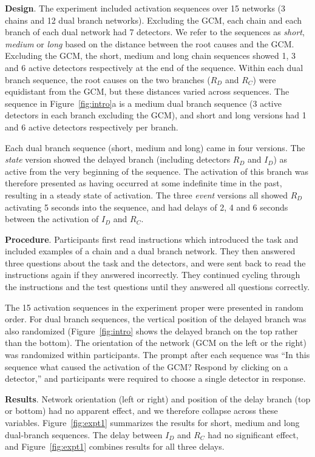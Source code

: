 \documentclass[10pt,letterpaper]{article}
\newcommand{\ev}[2]{$#1_#2$}
\begin{document}
\textbf{Design}.  The experiment included activation sequences over 15 networks (3 chains and 12 dual branch networks). Excluding the GCM, each chain and each branch of each dual network had 7 detectors. We refer to the sequences as \emph{short}, \emph{medium} or \emph{long} based on the distance between the root causes and the GCM. Excluding the GCM, the short, medium and long chain sequences showed 1, 3 and 6 active detectors respectively at the end of the sequence. Within each dual branch sequence, the root causes on the two branches (\ev{R}{D} and \ev{R}{C}) were equidistant from the GCM, but these distances varied across sequences. The sequence in Figure~\ref{fig:intro}a is a medium dual branch sequence (3 active detectors in each branch excluding the GCM), and short and long versions had 1 and 6 active detectors respectively per branch.

Each dual branch sequence (short, medium and long) came in four versions. The \emph{state} version showed the delayed branch (including detectors \ev{R}{D} and \ev{I}{D}) as active from the very beginning of the sequence. The activation of this branch was therefore presented as having occurred at some indefinite time in the past, resulting in a steady state of activation. The three \emph{event} versions all showed \ev{R}{D} activating 5 seconds into the sequence, and had delays of 2, 4 and 6 seconds between the activation of \ev{I}{D} and \ev{R}{C}.


\textbf{Procedure}. 
Participants first read instructions which introduced the task and included examples of a chain and a dual branch network. They then answered three questions about the task and the detectors, and were sent back to read the instructions again if they answered incorrectly. They continued cycling through the instructions and the test questions until they answered all questions correctly.

The 15 activation sequences in the experiment proper were presented in random order. For dual branch sequences, the vertical position of the delayed branch was also randomized (Figure~\ref{fig:intro} shows the delayed branch on the top rather than the bottom). The orientation of the network (GCM on the left or the right) was randomized within participants.  The prompt after each sequence was ``In this sequence what caused the activation of the GCM? Respond by clicking on a detector,'' and participants were required to choose a single detector in response. 

\textbf{Results}. 
Network orientation (left or right) and position of the delay branch (top or bottom) had no apparent effect, and we therefore collapse across these variables. Figure~\ref{fig:expt1} summarizes the results for short, medium and long dual-branch sequences. The delay between \ev{I}{D} and \ev{R}{C} had no significant effect, and Figure~\ref{fig:expt1} combines results for all three delays.  
\end{document}
